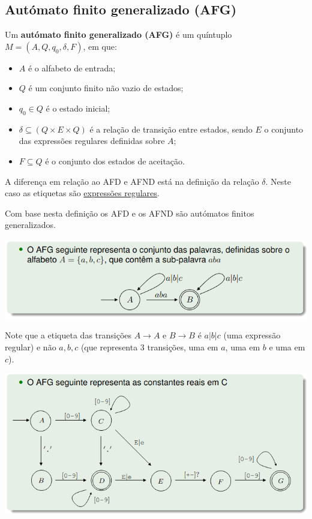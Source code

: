 \documentclass{article}
\begin{document}
\begin{flushleft}
  \subsection{Autómato finito generalizado (AFG)}

  \item Um \textbf{autómato finito generalizado (AFG)} é um quíntuplo $M = (A,Q,q_0, \delta, F)$, em que:
  \begin{itemize}
    \item $A$ é o alfabeto de entrada;
    \item $Q$ é um conjunto finito não vazio de estados;
    \item $q_0 \in Q$ é o estado inicial;
    \item $\delta \subseteq (Q \times E \times Q)$ é a relação de transição entre estados, sendo $E$ o conjunto das
    expressões regulares definidas sobre $A$;
    \item $F \subseteq Q$ é o conjunto dos estados de aceitação.
  \end{itemize}
  \item A diferença em relação ao AFD e AFND está na definição da relação $\delta$. Neste caso as etiquetas são \uline{expressões regulares}.
  \item Com base nesta definição os AFD e os AFND são autómatos finitos generalizados.
  \break

  \begin{center}
    \includegraphics[scale=0.4]{81}
  \end{center}

  \item Note que a etiqueta das transições $A \longrightarrow A$ e $B \longrightarrow B$ é $a|b|c$ (uma expressão regular) e
  não $a,b,c$ (que representa 3 transições, uma em $a$, uma em $b$ e uma em $c$).

  \begin{center}
    \includegraphics[scale=0.4]{82}
  \end{center}


\end{flushleft}
\end{document}
